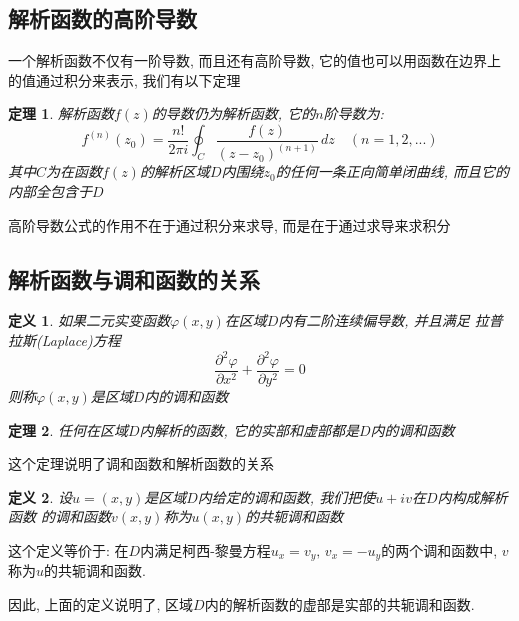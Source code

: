 \documentclass[12pt, a4paper, oneside]{ctexart}
\theoremstyle{plain}
\newtheorem{theorem}{定理}[section]
\newtheorem{definition}{定义}[section]
\theoremstyle{definition}
\theoremstyle{definition}
\begin{document}
\subsection{解析函数的高阶导数}
一个解析函数不仅有一阶导数, 而且还有高阶导数, 它的值也可以用函数在边界上的值通过积分来表示, 我们有以下定理
\begin{theorem}
    解析函数$f(z)$的导数仍为解析函数, 它的$n$阶导数为:
    \[
        f^{(n)}(z_0)=\frac{n!}{2\pi i}\oint_{C}\frac{f(z)}{(z-z_0)^{(n+1)}}\,dz \quad (n=1,2,...)
    \]
    其中$C$为在函数$f(z)$的解析区域$D$内围绕$z_0$的任何一条正向简单闭曲线, 而且它的内部全包含于$D$
\end{theorem}
高阶导数公式的作用不在于通过积分来求导, 而是在于通过求导来求积分

\subsection{解析函数与调和函数的关系}
\begin{definition}
    如果二元实变函数$\varphi(x,y)$在区域$D$内有二阶连续偏导数, 并且满足
    拉普拉斯(Laplace)方程
    \[
    \frac{\partial^2\varphi}{\partial x^2}+\frac{\partial^2\varphi}{\partial y^2}=0
    \]
    则称$\varphi(x,y)$是区域$D$内的调和函数
\end{definition}
\begin{theorem}
    任何在区域$D$内解析的函数, 它的实部和虚部都是$D$内的调和函数
\end{theorem}
这个定理说明了调和函数和解析函数的关系
\begin{definition}
    设$u=(x,y)$是区域$D$内给定的调和函数, 我们把使$u+iv$在$D$内构成解析函数
    的调和函数$v(x,y)$称为$u(x,y)$的共轭调和函数
\end{definition}
这个定义等价于: 在$D$内满足柯西-黎曼方程$u_x=v_y,\,v_x=-u_y$的两个调和函数中, 
$v$称为$u$的共轭调和函数.

因此, 上面的定义说明了, 区域$D$内的解析函数的虚部是实部的共轭调和函数.
\end{document}

